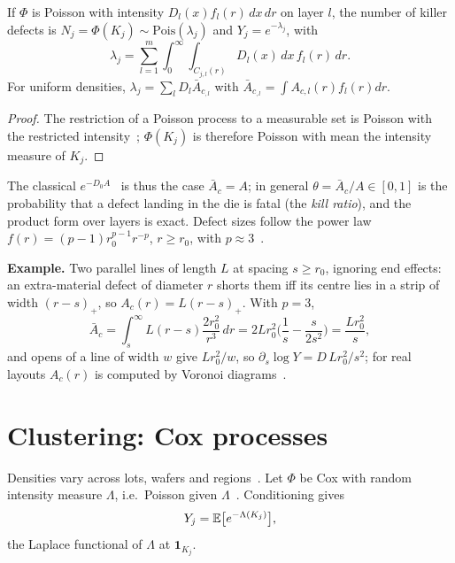 \documentclass[10pt,twocolumn]{article}
\newcommand{\Pois}{\mathrm{Pois}}
\newcommand{\Ac}{\bar A_c}
\newcommand{\one}{\mathbf 1}
\begin{document}
\begin{proposition}\label{prop:pois}
If $\Phi$ is Poisson with intensity $D_l(x)f_l(r)\,dx\,dr$ on layer $l$, the number of killer defects is $N_j=\Phi(K_j)\sim\Pois(\lambda_j)$ and $Y_j=e^{-\lambda_j}$, with
\begin{equation}
\lambda_j=\sum_{l=1}^m\int_0^\infty\!\!\int_{C_{j,l}(r)}D_l(x)\,dx\,f_l(r)\,dr .
\end{equation}
For uniform densities, $\lambda_j=\sum_lD_l\Ac_{,l}$ with $\Ac_{,l}=\int A_{c,l}(r)f_l(r)dr$.
\end{proposition}
\begin{proof}
The restriction of a Poisson process to a measurable set is Poisson with the restricted intensity~\cite{kingman1993}; $\Phi(K_j)$ is therefore Poisson with mean the intensity measure of $K_j$.
\end{proof}
The classical $e^{-D_0A}$~\cite{leachman2014} is thus the case $\Ac=A$; in general $\theta=\Ac/A\in[0,1]$ is the probability that a defect landing in the die is fatal (the \emph{kill ratio}), and the product form over layers is exact. Defect sizes follow the power law $f(r)=(p-1)r_0^{p-1}r^{-p}$, $r\ge r_0$, with $p\approx3$~\cite{stapper1983,ferrisprabhu1985}.

\textbf{Example.} Two parallel lines of length $L$ at spacing $s\ge r_0$, ignoring end effects: an extra-material defect of diameter $r$ shorts them iff its centre lies in a strip of width $(r-s)_+$, so $A_c(r)=L(r-s)_+$. With $p=3$,
\[
\Ac=\int_s^\infty L(r-s)\frac{2r_0^2}{r^3}\,dr=2Lr_0^2\Big(\frac1s-\frac{s}{2s^2}\Big)=\frac{Lr_0^2}{s},
\]
and opens of a line of width $w$ give $Lr_0^2/w$, so $\partial_s\log Y=D\,Lr_0^2/s^2$; for real layouts $A_c(r)$ is computed by Voronoi diagrams~\cite{papadopoulou1999}.

\section{Clustering: Cox processes}
Densities vary across lots, wafers and regions~\cite{stapper1986,cunningham1990}. Let $\Phi$ be Cox with random intensity measure $\Lambda$, i.e.\ Poisson given $\Lambda$~\cite{daley2008}. Conditioning gives
\begin{equation}
Y_j=\mathbb{E}\big[e^{-\Lambda(K_j)}\big],
\end{equation}
the Laplace functional of $\Lambda$ at $\one_{K_j}$.
\end{document}

